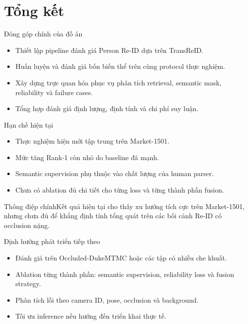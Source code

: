 \documentclass[aspectratio=169,10pt]{beamer}
\newcommand{\keymessage}[1]{\begin{block}{Thông điệp chính}#1\end{block}}
\begin{document}
\section{Tổng kết}

\begin{frame}{Đóng góp chính của đồ án}
  \begin{itemize}
    \item Thiết lập pipeline đánh giá Person Re-ID dựa trên TransReID.
    \item Huấn luyện và đánh giá bốn biến thể trên cùng protocol thực nghiệm.
    \item Xây dựng trực quan hóa phục vụ phân tích retrieval, semantic mask, reliability và failure cases.
    \item Tổng hợp đánh giá định lượng, định tính và chi phí suy luận.
  \end{itemize}
\end{frame}

\begin{frame}{Hạn chế hiện tại}
  \begin{itemize}
    \item Thực nghiệm hiện mới tập trung trên Market-1501.
    \item Mức tăng Rank-1 còn nhỏ do baseline đã mạnh.
    \item Semantic supervision phụ thuộc vào chất lượng của human parser.
    \item Chưa có ablation đủ chi tiết cho từng loss và từng thành phần fusion.
  \end{itemize}
  \vspace{.16cm}
  \keymessage{Kết quả hiện tại cho thấy xu hướng tích cực trên Market-1501, nhưng chưa đủ để khẳng định tính tổng quát trên các bối cảnh Re-ID có occlusion nặng.}
\end{frame}

\begin{frame}{Định hướng phát triển tiếp theo}
  \begin{itemize}
    \item Đánh giá trên Occluded-DukeMTMC hoặc các tập có nhiều che khuất.
    \item Ablation từng thành phần: semantic supervision, reliability loss và fusion strategy.
    \item Phân tích lỗi theo camera ID, pose, occlusion và background.
    \item Tối ưu inference nếu hướng đến triển khai thực tế.
  \end{itemize}
\end{frame}
\end{document}
